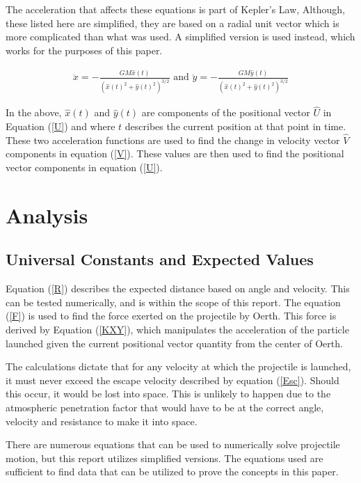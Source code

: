 \documentclass[12pt]{extarticle}
\begin{document}
The acceleration that affects these equations is part of Kepler's Law\cite{RVD}, Although, these listed here are simplified, they are based on a radial unit vector\cite{EMC} which is more complicated than what was used. A simplified version is used instead, which works for the purposes of this paper.

\begin{align}
\label{KXY}
\ddot{x} = -\frac{GM\hat{x}(t)}{(\hat{x}(t)^2+\hat{y}(t)^2)^{3/2}}\text{ and } \ddot{y} = -\frac{GM\hat{y}(t)}{(\hat{x}(t)^2+\hat{y}(t)^2)^{3/2}}
\end{align}

In the above, $\hat{x}(t)$ and $\hat{y}(t)$ are components of the positional vector $\hat{U}$ in Equation (\ref{U}) and where $t$ describes the current position at that point in time. These two acceleration functions are used to find the change in velocity vector $\hat{V}$ components in equation (\ref{V}). These values are then used to find the positional vector components in equation (\ref{U}).

\section{Analysis}

\subsection{Universal Constants and Expected Values}
Equation (\ref{R}) describes the expected distance based on angle and velocity. This can be tested numerically, and is within the scope of this report. The equation (\ref{F}) is used to find the force exerted on the projectile by Oerth. This force is derived by Equation (\ref{KXY}), which manipulates the acceleration of the particle launched given the current positional vector quantity from the center of Oerth.

The calculations dictate that for any velocity at which the projectile is launched, it must never exceed the escape velocity described by equation (\ref{Esc}). Should this occur, it would be lost into space. This is unlikely to happen due to the atmospheric penetration factor that would have to be at the correct angle, velocity and resistance to make it into space.\cite{NASA}


There are numerous equations that can be used to numerically solve projectile motion, but this report utilizes simplified versions. The equations used are sufficient to find data that can be utilized to prove the concepts in this paper.
\end{document}
